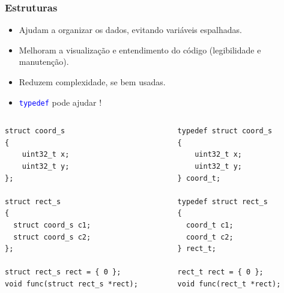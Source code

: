 \documentclass{beamer}
\begin{document}
\begin{frame}[fragile]
	\frametitle{Estruturas}
	\begin{itemize}
	\item Ajudam a organizar os dados, evitando variáveis espalhadas.
	\item Melhoram a visualização e entendimento do código (legibilidade e manutenção).
	\item Reduzem complexidade, se bem usadas.
	\item \texttt{\textcolor{blue}{typedef}} pode ajudar !
	\end{itemize}
	\begin{columns}[T] %
		\begin{column}{.5\textwidth}
	\begin{lstlisting}[style=customc]
struct coord_s
{
	uint32_t x;
	uint32_t y;
};

struct rect_s
{
  struct coord_s c1;
  struct coord_s c2;
};

struct rect_s rect = { 0 };
void func(struct rect_s *rect);
	\end{lstlisting}
		\end{column}%
		\hfill%
		\begin{column}{.5\textwidth}
	\begin{lstlisting}[style=customc]
typedef struct coord_s
{
	uint32_t x;
	uint32_t y;
} coord_t;

typedef struct rect_s
{
  coord_t c1;
  coord_t c2;
} rect_t;

rect_t rect = { 0 };
void func(rect_t *rect);
	\end{lstlisting}
		\end{column}%
	\end{columns}
\end{frame}
\end{document}
